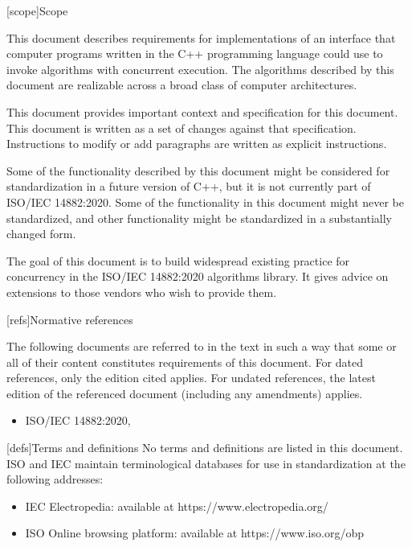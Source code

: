 
[scope]{Scope}

This document describes requirements for implementations of an interface that computer programs written in the C++ programming language could use to invoke algorithms with concurrent execution. The algorithms described by this document are realizable across a broad class of computer architectures.

This document provides important context and specification for
this document. This document is written as a set of changes against that specification.  Instructions to modify or add paragraphs are written as
explicit instructions.

Some of the functionality described by this document might be considered for standardization in a future version of C++, but it is not currently part of ISO/IEC 14882:2020. Some of the functionality in this document might never be standardized, and other functionality might be standardized in a substantially changed form.

The goal of this document is to build widespread existing practice for concurrency in the ISO/IEC 14882:2020 algorithms library. It gives advice on extensions to those vendors who wish to provide them.

[refs]{Normative references}

The following documents are referred to in the text in such a way that some or all of their content constitutes requirements of this document. For dated references, only the edition cited applies. For undated references, the latest edition of the referenced document (including any amendments) applies.

\begin{itemize}
\item ISO/IEC 14882:2020, 
\end{itemize}



[defs]{Terms and definitions}
{}%
No terms and definitions are listed in this document. ISO and IEC maintain
terminological databases for use in standardization at the following addresses:

\begin{itemize}
    \item IEC Electropedia: available at https://www.electropedia.org/
    \item ISO Online browsing platform: available at https://www.iso.org/obp
\end{itemize}

